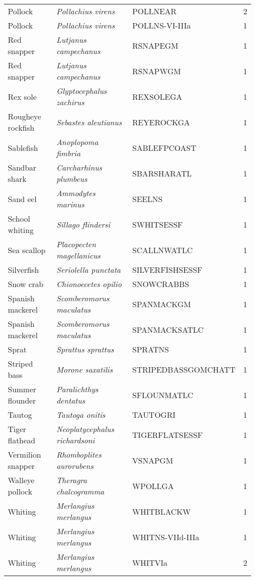 \begin{center}
\begin{footnotesize}
\begin{longtable}{l | l | l | r}
Pollock & \textit{Pollachius virens} & POLLNEAR & 2 \\
Pollock & \textit{Pollachius virens} & POLLNS-VI-IIIa & 1 \\
Red snapper & \textit{Lutjanus campechanus} & RSNAPEGM & 1 \\
Red snapper & \textit{Lutjanus campechanus} & RSNAPWGM & 1 \\
Rex sole & \textit{Glyptocephalus zachirus} & REXSOLEGA & 1 \\
Rougheye rockfish & \textit{Sebastes aleutianus} & REYEROCKGA & 1 \\
Sablefish & \textit{Anoplopoma fimbria} & SABLEFPCOAST & 1 \\
Sandbar shark & \textit{Carcharhinus plumbeus} & SBARSHARATL & 1 \\
Sand eel & \textit{Ammodytes marinus} & SEELNS & 1 \\
School whiting & \textit{Sillago flindersi} & SWHITSESSF & 1 \\
Sea scallop & \textit{Placopecten magellanicus} & SCALLNWATLC & 1 \\
Silverfish & \textit{Seriolella punctata} & SILVERFISHSESSF & 1 \\
Snow crab & \textit{Chionoecetes opilio} & SNOWCRABBS & 1 \\
Spanish mackerel & \textit{Scomberomorus maculatus} & SPANMACKGM & 1 \\
Spanish mackerel & \textit{Scomberomorus maculatus} & SPANMACKSATLC & 1 \\
Sprat & \textit{Sprattus sprattus} & SPRATNS & 1 \\
Striped bass & \textit{Morone saxatilis} & STRIPEDBASSGOMCHATT & 1 \\
Summer flounder & \textit{Paralichthys dentatus} & SFLOUNMATLC & 1 \\
Tautog & \textit{Tautoga onitis} & TAUTOGRI & 1 \\
Tiger flathead & \textit{Neoplatycephalus richardsoni} & TIGERFLATSESSF & 1 \\
Vermilion snapper & \textit{Rhomboplites aurorubens} & VSNAPGM & 1 \\
Walleye pollock & \textit{Theragra chalcogramma} & WPOLLGA & 1 \\
Whiting & \textit{Merlangius merlangus} & WHITBLACKW & 1 \\
Whiting & \textit{Merlangius merlangus} & WHITNS-VIId-IIIa & 1 \\
Whiting & \textit{Merlangius merlangus} & WHITVIa & 2 \\

\end{longtable}
\end{footnotesize}
\end{center}
